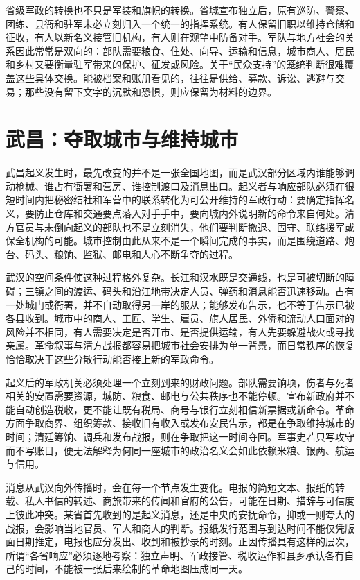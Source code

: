 省级军政的转换也不只是军装和旗帜的转换。省城宣布独立后，原有巡防、警察、团练、县衙和驻军未必立刻归入一个统一的指挥系统。有人保留旧职以维持仓储和征收，有人以新名义接管旧机构，有人则在观望中防备对手。军队与地方社会的关系因此常常是双向的：部队需要粮食、住处、向导、运输和信息，城市商人、居民和乡村又要衡量驻军带来的保护、征发或风险。关于“民众支持”的笼统判断很难覆盖这些具体交换。能被档案和账册看见的，往往是供给、募款、诉讼、逃避与交易；那些没有留下文字的沉默和恐惧，则应保留为材料的边界。

\section{武昌：夺取城市与维持城市}

武昌起义发生时，最先改变的并不是一张全国地图，而是武汉部分区域内谁能够调动枪械、谁占有衙署和营房、谁控制渡口及消息出口。起义者与响应部队必须在很短时间内把秘密结社和军营中的联系转化为可公开维持的军政行动：要确定指挥名义，要防止仓库和交通要点落入对手手中，要向城内外说明新的命令来自何处。清方官员与未倒向起义的部队也不是立刻消失，他们要判断撤退、固守、联络援军或保全机构的可能。城市控制由此从来不是一个瞬间完成的事实，而是围绕道路、炮台、码头、粮饷、监狱、邮电和人心不断争夺的过程。

武汉的空间条件使这种过程格外复杂。长江和汉水既是交通线，也是可被切断的障碍；三镇之间的渡运、码头和沿江地带决定人员、弹药和消息能否迅速移动。占有一处城门或衙署，并不自动取得另一岸的服从；能够发布告示，也不等于告示已被各县收到。城市中的商人、工匠、学生、雇员、旗人居民、外侨和流动人口面对的风险并不相同，有人需要决定是否开市、是否提供运输，有人先要躲避战火或寻找亲属。革命叙事与清方战报都容易把城市社会安排为单一背景，而日常秩序的恢复恰恰取决于这些分散行动能否接上新的军政命令。

起义后的军政机关必须处理一个立刻到来的财政问题。部队需要饷项，伤者与死者相关的安置需要资源，城防、粮食、邮电与公共秩序也不能停顿。宣布新政府并不能自动创造税收，更不能让既有税局、商号与银行立刻相信新票据或新命令。革命方面争取商界、组织筹款、接收旧有收入或发布安民告示，都是在争取维持城市的时间；清廷筹饷、调兵和发布战报，则在争取把这一时间夺回。军事史若只写攻守而不写账目，便无法解释为何同一座城市的政治名义会如此依赖米粮、银两、航运与信用。

消息从武汉向外传播时，会在每一个节点发生变化。电报的简短文本、报纸的转载、私人书信的转述、商旅带来的传闻和官府的公告，可能在日期、措辞与可信度上彼此冲突。某省首先收到的是起义消息，还是中央的安抚命令，抑或一则夸大的战报，会影响当地官员、军人和商人的判断。报纸发行范围与到达时间不能仅凭版面日期推定，电报也应分发出、收到和被抄录的时刻。正因传播具有这样的层次，所谓“各省响应”必须逐地考察：独立声明、军政接管、税收运作和县乡承认各有自己的时间，不能被一张后来绘制的革命地图压成同一天。

